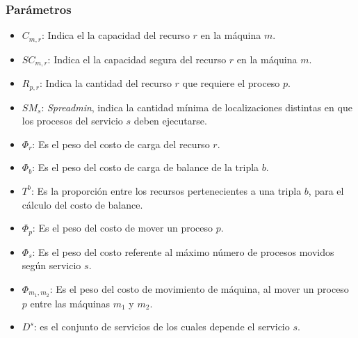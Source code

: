 \subsubsection{Parámetros}
\begin{itemize}
	\item $C_{m,r}$: Indica el la capacidad del recurso $r$ en la máquina $m$.
	\item $SC_{m,r}$: Indica el la capacidad segura del recurso $r$ en la máquina $m$.
	\item $R_{p,r}$: Indica la cantidad del recurso $r$ que requiere el proceso $p$.
	\item $SM_{s}$: \textit{Spreadmin}, indica la cantidad mínima de localizaciones distintas en que los procesos del servicio $s$ deben ejecutarse.
	\item $\Phi_{r}$: Es el peso del costo de carga del recurso $r$.
	\item $\Phi_{b}$: Es el peso del costo de carga de balance de la tripla $b$.
	\item $T^b$: Es la proporción entre los recursos pertenecientes a una tripla $b$, para el cálculo del costo de balance.
	\item $\Phi_{p}$: Es el peso del costo de mover un proceso $p$.
	\item $\Phi_{s}$: Es el peso del costo referente al máximo número de procesos movidos según servicio $s$.
	\item $\Phi_{m_1,m_2}$: Es el peso del costo de movimiento de máquina, al mover un proceso $p$ entre las máquinas $m_1$ y $m_2$.
	\item $D^s$: es el conjunto de servicios de los cuales depende el servicio $s$.
\end{itemize}

